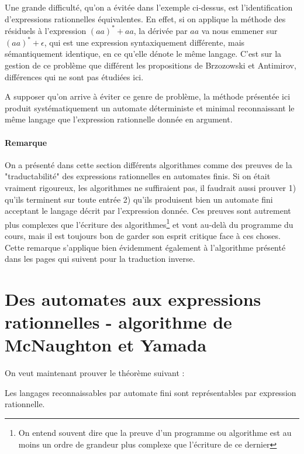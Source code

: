 Une grande difficulté, qu'on a évitée dans l'exemple ci-dessus, est l'identification d'expressions rationnelles équivalentes. En effet, si on applique la méthode des résiduels à l'expression $(aa)^*+aa$, la dérivée par $aa$ va nous emmener sur $(aa)^* + \epsilon$, qui est une expression syntaxiquement différente, mais sémantiquement identique, en ce qu'elle dénote le même langage. C'est sur la gestion de ce problème que différent les propositions de Brzozowski et Antimirov, différences qui ne sont pas étudiées ici. 

A supposer qu'on arrive à éviter ce genre de problème, la méthode présentée ici produit systématiquement un automate déterministe et minimal reconnaissant le même langage que l'expression rationnelle donnée en argument.



\paragraph*{Remarque} On a présenté dans cette section différents algorithmes comme des preuves de la "traductabilité" des expressions rationnelles en automates finis. Si on était vraiment rigoureux, les algorithmes ne suffiraient pas, il faudrait aussi prouver 1) qu'ils terminent sur toute entrée 2) qu'ils produisent bien un automate fini acceptant le langage décrit par l'expression donnée. Ces preuves sont autrement plus complexes que l'écriture des algorithmes\footnote{On entend souvent dire que la preuve d'un programme ou algorithme est au moins un ordre de grandeur plus complexe que l'écriture de ce dernier} et vont au-delà du programme du cours, mais il est toujours bon de garder son esprit critique face à ces choses. Cette remarque s'applique bien évidemment également à l'algorithme présenté dans les pages qui suivent pour la traduction inverse.



\section{Des automates aux expressions rationnelles - algorithme de McNaughton et Yamada}

On veut maintenant prouver le théorème suivant :

\begin{theorem}
Les langages reconnaissables par automate fini sont représentables par expression rationnelle.
\end{theorem}

